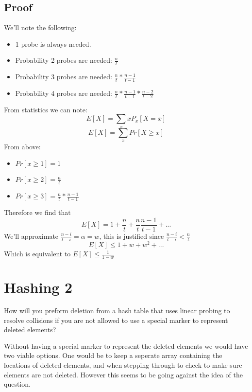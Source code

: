 \documentclass[12pt]{article}
\begin{document}
\subsection{Proof}
We'll note the following:
\begin{itemize}
	\item 1 probe is always needed.
	\item Probability 2 probes are needed: $\frac{n}{t}$
	\item Probability 3 probes are needed: $\frac{n}{t}*\frac{n-1}{t-1}$
	\item Probability 4 probes are needed: $\frac{n}{t}*\frac{n-1}{t-1}*\frac{n-2}{t-2}$
\end{itemize}
From statistics we can note:
\begin{displaymath}
	E[X]=\sum_x xP_x[X=x]
\end{displaymath}
\begin{displaymath}
	E[X]=\sum_x Pr[X\geq x]
\end{displaymath}
From above:
\begin{itemize}
	\item $Pr[x \geq 1] = 1$
	\item $Pr[x \geq 2] = \frac{n}{t}$
	\item $Pr[x \geq 3] = \frac{n}{t}*\frac{n-1}{t-1}$
\end{itemize}
Therefore we find that
\begin{displaymath}
	E[X]=1+\frac{n}{t}+\frac{n}{t}\frac{n-1}{t-1}+...
\end{displaymath}
We'll approximate $ \frac{n-i}{t-i} = \alpha = w $, this is justified since $ \frac{n-i}{t-i} < \frac{n}{t}$
\begin{displaymath}
	E[X] \leq 1 + w + w^2 + ...
\end{displaymath}
Which is equivalent to $ E[X] \leq \frac{1}{1-w} $

\section{Hashing 2}
How will you preform deletion from a hash table that uses linear probing to resolve collisions if you are not allowed to use a special marker to represent deleted elements?


Without having a special marker to represent the deleted elements we would have two viable options.
One would be to keep a seperate array containing the locations of deleted elements, and when stepping through to check to make sure elements are not deleted. However this seems to be going against the idea of the question.
\end{document}

